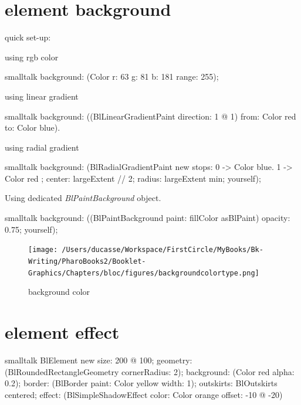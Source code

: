 \documentclass[10pt,twoside,english]{_support/latex/sbabook/sbabook}
\begin{document}
\section{element background}
quick set-up: 

using rgb color
\begin{displaycode}{smalltalk}
background: (Color r: 63 g: 81           b: 181     range: 255);
\end{displaycode}

using linear gradient
\begin{displaycode}{smalltalk}
background: ((BlLinearGradientPaint direction: 1 @ 1) from: Color red to: Color blue).
\end{displaycode}

using radial gradient
\begin{displaycode}{smalltalk}
background: (BlRadialGradientPaint new
stops: { 0 -> Color blue. 1 -> Color red };
center: largeExtent // 2;
radius: largeExtent min;
yourself);
\end{displaycode}

Using dedicated \textit{BlPaintBackground} object.
\begin{displaycode}{smalltalk}
background: ((BlPaintBackground paint: fillColor asBlPaint) opacity: 0.75; yourself);
\end{displaycode}

\begin{figure}[htpb]
\begin{center}
\texttt{[image: /Users/ducasse/Workspace/FirstCircle/MyBooks/Bk-Writing/PharoBooks2/Booklet-Graphics/Chapters/bloc/figures/backgroundcolortype.png]}
\caption{background color}
\end{center}
\end{figure}


\section{element effect}
\begin{displaycode}{smalltalk}
BlElement new
        size: 200 @ 100;
        geometry: (BlRoundedRectangleGeometry cornerRadius: 2);
        background: (Color red alpha: 0.2);
        border: (BlBorder paint: Color yellow width: 1);
        outskirts: BlOutskirts centered;
        effect:
            (BlSimpleShadowEffect color: Color orange offset: -10 @ -20)
\end{displaycode}
\end{document}
